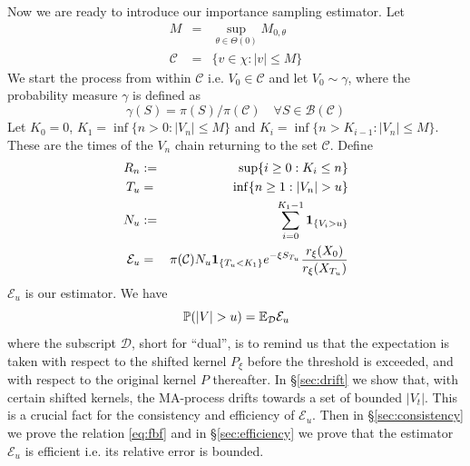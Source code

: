 \documentclass[aoas,preprint]{imsart}
\numberwithin{equation}{section}
\theoremstyle{plain}
\begin{document}
Now we are ready to introduce our importance sampling estimator.
Let
\begin{eqnarray*}
  M &=& \sup_{\theta \in \Theta(0)} M_{0, \theta} \\
  \mathcal C &=& \{v \in \chi: |v| \leq M\}
\end{eqnarray*}
We start the process from within $\mathcal C$ i.e.
$V_0 \in \mathcal C$
and let $V_0 \sim \gamma$, where the probability
measure $\gamma$ is defined as
\[
\gamma(S) = \pi(S) / \pi(\mathcal C)
\quad \forall S \in \mathcal B(\mathcal C)
\]
Let $K_0 = 0$,
$K_1 = \inf\{n > 0: |V_n| \leq M\}$ and
$K_i = \inf\{n > K_{i-1}: |V_n| \leq M\}$.
These are the times of the $V_n$ chain returning to the set
$\mathcal C$. Define
\begin{eqnarray*}
  R_n &:=& \sup\{i \geq 0: K_i \leq n\} \\
  T_u &=& \inf\{n \geq 1: |V_n| > u\} \\
  N_u &:=& \sum_{i=0}^{K_1 - 1} \mathbf{1}_{\{V_i > u\}} \\
  \mathcal E_u &=& \pi(\mathcal C)
  N_u \mathbf{1}_{\{T_u < K_1\}} e^{-\xi S_{T_u}}
  {r_\xi(X_0) \over r_\xi(X_{T_u})}
\end{eqnarray*}
$\mathcal E_u$ is our estimator. We have
\begin{equation}
  \label{eq:fbf}
  \mathbb{P}(|V| > u) = \mathbb{E}_{\mathcal D} \mathcal E_u
\end{equation}
where the subscript $\mathcal D$, short for ``dual'', is to remind us
that the expectation is taken with respect to the shifted kernel
$P_\xi$ before the threshold is exceeded, and with respect to the
original kernel $P$ thereafter.
In \S\ref{sec:drift} we show that, with certain shifted kernels, the
MA-process drifts towards a set of bounded $|V_t|$. This is a crucial
fact for the consistency and efficiency of $\mathcal E_u$.
Then in \S\ref{sec:consistency} we prove the relation \eqref{eq:fbf} and in
\S\ref{sec:efficiency} we prove that the estimator $\mathcal E_u$ is
efficient i.e. its relative error is bounded.
\end{document}
